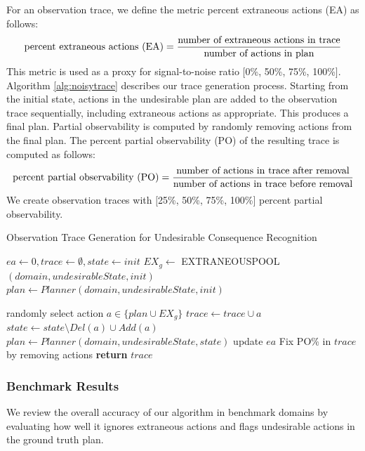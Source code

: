For an observation trace, we define the metric percent extraneous actions (EA) as follows:
\begin{equation}
\textup{percent extraneous actions (EA)} = \frac{\textup{number of extraneous actions in trace}} {\textup{number of actions in plan}}
\end{equation} 
This metric is used as a proxy for signal-to-noise ratio $[$0\%, 50\%, 75\%, 100\%$]$. 
Algorithm \ref{alg:noisytrace} describes our trace generation process. 
Starting from the initial state, actions in the undesirable plan are added to the observation trace sequentially, including extraneous actions as appropriate. 
This produces a final plan. 
Partial observability is computed by randomly removing actions from the final plan.
The percent partial observability (PO) of the resulting trace is computed as follows:
\begin{equation}
\textup{percent partial observability (PO)} = \frac{\textup{number of actions in trace after removal}} {\textup{number of actions in trace before removal}}
\end{equation} 
We create observation traces with $[$25\%, 50\%, 75\%, 100\%$]$ percent partial observability. 

\begin{algorithm}
    \caption{Observation Trace Generation for Undesirable Consequence Recognition}
    \label{alg:noisytrace}
    \begin{algorithmic}[1] %
        	\State $ea\gets 0, trace \gets \emptyset, state \gets init$
			\State $EX_g\gets$ \textsc{EXTRANEOUSPOOL}$(domain,undesirableState,init)$
			\State $plan \gets Planner(domain, undesirableState, init)$

				\State randomly select action $a \in \lbrace plan \cup EX_g\rbrace$
					\State $trace \gets trace \cup a$
					\State $state \gets state\setminus Del(a)\cup Add(a)$
					\State $plan \gets Planner(domain,undesirableState,state)$
					\State update $ea$
				\EndIf
			\EndWhile
			\State Fix PO\% in $trace$ by removing actions
            \State \textbf{return} $trace$
        \EndProcedure
    \end{algorithmic}
\end{algorithm}



\subsubsection{Benchmark Results}
We review the overall accuracy of our algorithm in benchmark domains by evaluating how well it ignores extraneous actions and flags undesirable actions in the ground truth plan.

